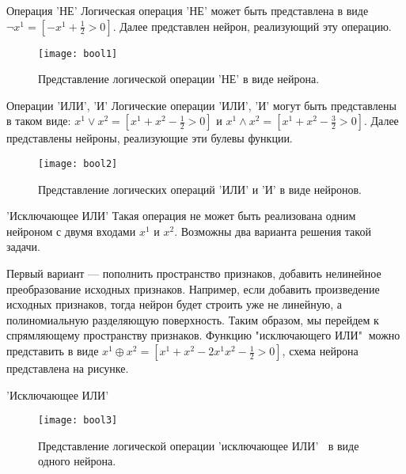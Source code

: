 \documentclass[11pt]{beamer}
\begin{document}
	\begin{frame}{Операция 'НЕ'}
		Логическая операция 'НЕ' может быть представлена в виде $\lnot x^1 = [-x^1+\frac{1}{2}>0]$. Далее представлен нейрон, реализующий эту операцию.
		
		\begin{figure}[H]
			\begin{center}
					\texttt{[image: bool1]}
					\caption{Представление логической операции 'НЕ' в виде нейрона.}
					\label{bool1}
			\end{center}
		\end{figure}
	\end{frame}

	\begin{frame}{Операции 'ИЛИ', 'И'}
		Логические операции 'ИЛИ', 'И' могут быть представлены в таком виде: $x^1 \lor x^2 = [x^1+x^2 -\frac{1}{2}>0]$ и $x^1 \wedge x^2 = [x^1+x^2 -\frac{3}{2}>0]$. Далее представлены нейроны, реализующие эти булевы функции.
		
		\begin{figure}[H]
			\begin{center}
					\texttt{[image: bool2]}
					\caption{Представление логических операций 'ИЛИ' и 'И' в виде нейронов.}
					\label{bool2}
			\end{center}
		\end{figure}
	\end{frame}

	\begin{frame}{'Исключающее ИЛИ'}
		Такая операция не может быть реализована одним нейроном с двумя входами $x^1$ и $x^2$. Возможны два варианта решения такой задачи. 
		
		Первый вариант --- пополнить пространство признаков, добавить нелинейное преобразование исходных признаков. Например, если добавить произведение исходных признаков, тогда нейрон будет строить уже не линейную, а полиномиальную разделяющую поверхность. Таким образом, мы перейдем к спрямляющему пространству признаков. Функцию "исключающего ИЛИ"$~$ можно представить в виде $x^1 \oplus x^2 = [x^1+x^2 -2x^1x^2-\frac{1}{2}>0]$, схема нейрона представлена на рисунке.
	\end{frame}

	\begin{frame}{'Исключающее ИЛИ'}
		\begin{figure}[H]
			\begin{center}
					\texttt{[image: bool3]}
					\caption{Представление логической операции 'исключающее ИЛИ' $~$ в виде одного нейрона.}
					\label{bool3}
			\end{center}
		\end{figure}
	\end{frame}
\end{document}
